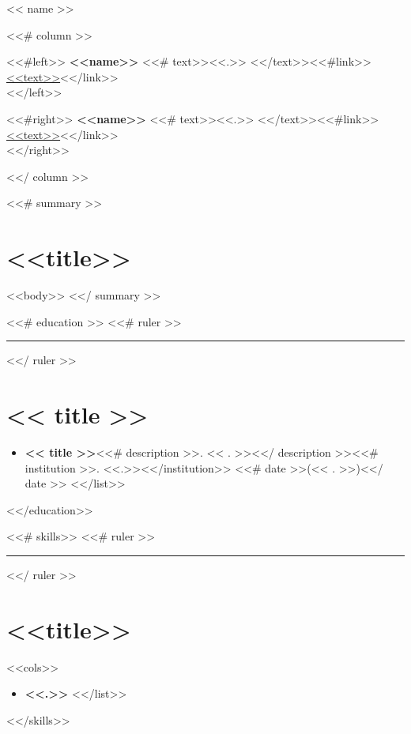 \documentclass[<<fontsize>>]{article}
\def\resumeruler{\begin{center}\rule{0.5\linewidth}{0.5pt}\end{center}}
\providecommand{\tightlist}{%
  \setlength{\itemsep}{0pt}\setlength{\parskip}{0pt}}
\begin{document}
{\huge << name >>}


<<# column >>
\bigskip

\begin{minipage}[t]{0.495\textwidth}
  <<#left>>
  \textbf{<<name>>} <<# text>><<.>> <</text>><<#link>>\href{<<to>>}{<<text>>}<</link>>\\
  <</left>>
\end{minipage} %
\begin{minipage}[t]{0.495\textwidth}
  <<#right>>
  \textbf{<<name>>} <<# text>><<.>> <</text>><<#link>>\href{<<to>>}{<<text>>}<</link>>\\
  <</right>>
\end{minipage}
<</ column >>



<<# summary >>
\section{<<title>>}

<<body>>
<</ summary >>


<<# education >>
<<# ruler >>\resumeruler<</ ruler >>
\section{<< title >>}

\begin{itemize}
  \tightlist
  <<# list >>
  \item \textbf{<< title >>}<<# description >>. << . >><</ description >><<# institution >>. <<.>><</institution>> <<# date >>(<< . >>)<</ date >>
  <</list>>
\end{itemize}
<</education>>


<<# skills>>
<<# ruler >>\resumeruler<</ ruler >>
\section{<<title>>}

\begin{multicols}{<<cols>>}
  \begin{itemize}
    <<#list>>
    \item \textbf{<<.>>}
    <</list>>
  \end{itemize}
\end{multicols}
<</skills>>
\end{document}
